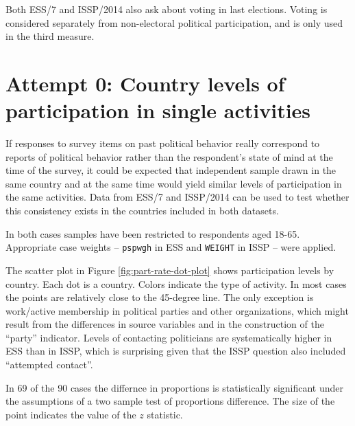 \documentclass[12pt,]{article}
\begin{document}
Both ESS/7 and ISSP/2014 also ask about voting in last elections. Voting is considered separately from non-electoral political participation, and is only used in the third measure.

\hypertarget{attempt-0-country-levels-of-participation-in-single-activities}{%
\section{Attempt 0: Country levels of participation in single activities}\label{attempt-0-country-levels-of-participation-in-single-activities}}

If responses to survey items on past political behavior really correspond to reports of political behavior rather than the respondent's state of mind at the time of the survey, it could be expected that independent sample drawn in the same country and at the same time would yield similar levels of participation in the same activities. Data from ESS/7 and ISSP/2014 can be used to test whether this consistency exists in the countries included in both datasets.

In both cases samples have been restricted to respondents aged 18-65. Appropriate case weights -- \texttt{pspwgh} in ESS and \texttt{WEIGHT} in ISSP -- were applied.

The scatter plot in Figure \ref{fig:part-rate-dot-plot} shows participation levels by country. Each dot is a country. Colors indicate the type of activity. In most cases the points are relatively close to the 45-degree line. The only exception is work/active membership in political parties and other organizations, which might result from the differences in source variables and in the construction of the ``party'' indicator. Levels of contacting politicians are systematically higher in ESS than in ISSP, which is surprising given that the ISSP question also included ``attempted contact''.

In 69 of the 90 cases the differnce in proportions is statistically significant under the assumptions of a two sample test of proportions difference. The size of the point indicates the value of the \(z\) statistic.
\end{document}
